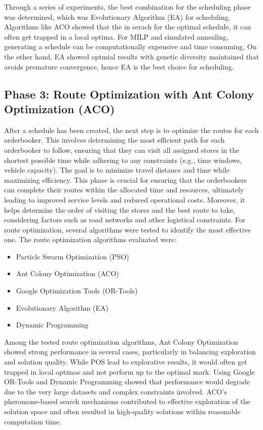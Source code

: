 Through a series of experiments, the best combination for the scheduling phase was determined, which was Evolutionary Algorithm (EA) for scheduling.
Algorithms like ACO showed that the in serach for the optimal schedule, it can often get trapped in a local optima. For MILP and simulated annealing, 
generating a schedule can be computationally expensive and time consuming. On the other hand, EA showed optmial results with genetic diversity maintained that
avoids premature convergence, hence EA is the best choice for scheduling.

\subsection{Phase 3: Route Optimization with Ant Colony Optimization (ACO)}
After a schedule has been created, the next step is to optimize the routes for each orderbooker. This involves determining the most efficient path for each orderbooker to follow, ensuring that they can visit all assigned stores in the shortest possible time while adhering to any constraints (e.g., time windows, vehicle capacity). The goal is to minimize travel distance and time while maximizing efficiency.
This phase is crucial for ensuring that the orderbookers can complete their routes within the allocated time and resources, ultimately leading to improved service levels and reduced operational costs.
Moreover, it helps determine the order of visiting the stores and the best route to take, considering factors such as road networks and other logistical constraints.
For route optimization, several algorithms were tested to identify the most effective one. The route optimization algorithms evaluated were:

\begin{itemize}
    \item Particle Swarm Optimization (PSO)
    \item Ant Colony Optimization (ACO)
    \item Google Optimization Tools (OR-Tools)
    \item Evolutionary Algorithm (EA)
    \item Dynamic Programming
\end{itemize}

Among the tested route optimization algorithms, Ant Colony Optimization showed strong performance in several cases, particularly in %
balancing exploration and solution quality. While POS lead to explorative results, it would often get trapped in local optimas and not 
perform up to the optimal mark. Using Google OR-Tools and Dynamic Programming showed that performance would degrade due to the very 
large datasets and complex constraints involved. ACO's pheromone-based search mechanisms contributed to effective exploration of the 
solution space and often resulted in high-quality solutions within reasonable computation time.


